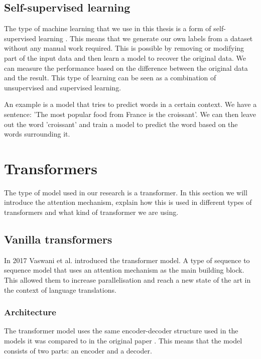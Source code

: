 \subsection{Self-supervised learning}

The type of machine learning that we use in this thesis is a form of self-supervised learning \cite{doersch_multi-task_2017}. This means that we generate our own labels from a dataset without any manual work required. This is possible by removing or modifying part of the input data and then learn a model to recover the original data. We can measure the performance based on the difference between the original data and the result. This type of learning can be seen as a combination of unsupervised and supervised learning.

An example is a model that tries to predict words in a certain context. We have a sentence: 'The most popular food from France is the croissant'. We can then leave out the word 'croissant' and train a model to predict the word based on the words surrounding it.

\section{Transformers}
\label{sec:prelim:transformers}

The type of model used in our research is a transformer. In this section we will introduce the attention mechanism, explain how this is used in different types of transformers and what kind of transformer we are using.

\subsection{Vanilla transformers}

In 2017 Vaswani et al.\cite{vaswani_attention_2017} introduced the transformer model. A type of sequence to sequence model that uses an attention mechanism as the main building block. This allowed them to increase parallelisation and reach a new state of the art in the context of language translations.

\subsubsection{Architecture}

The transformer model uses the same encoder-decoder structure used in the models it was compared to in the original paper \cite{bahdanau_neural_2016, cho_learning_2014}. This means that the model consists of two parts: an encoder and a decoder.

